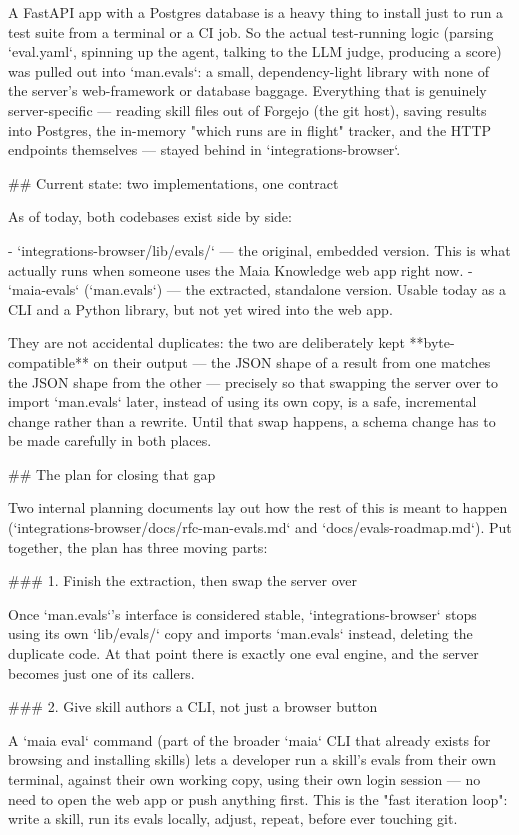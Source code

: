 A FastAPI app with a Postgres database is a heavy thing to install just to run a test suite from a terminal or a CI job.
So the actual test-running logic (parsing `eval.yaml`, spinning up the agent, talking to the LLM judge, producing a score) was pulled out into `man.evals`: a small, dependency-light library with none of the server's web-framework or database baggage.
Everything that is genuinely server-specific — reading skill files out of Forgejo (the git host), saving results into Postgres, the in-memory "which runs are in flight" tracker, and the HTTP endpoints themselves — stayed behind in `integrations-browser`.

## Current state: two implementations, one contract

As of today, both codebases exist side by side:

- `integrations-browser/lib/evals/` — the original, embedded version. This is what actually runs when someone uses the Maia Knowledge web app right now.
- `maia-evals` (`man.evals`) — the extracted, standalone version. Usable today as a CLI and a Python library, but not yet wired into the web app.

They are not accidental duplicates: the two are deliberately kept **byte-compatible** on their output — the JSON shape of a result from one matches the JSON shape from the other — precisely so that swapping the server over to import `man.evals` later, instead of using its own copy, is a safe, incremental change rather than a rewrite. Until that swap happens, a schema change has to be made carefully in both places.

## The plan for closing that gap

Two internal planning documents lay out how the rest of this is meant to happen (`integrations-browser/docs/rfc-man-evals.md` and `docs/evals-roadmap.md`). Put together, the plan has three moving parts:

### 1. Finish the extraction, then swap the server over

Once `man.evals`'s interface is considered stable, `integrations-browser` stops using its own `lib/evals/` copy and imports `man.evals` instead, deleting the duplicate code.
At that point there is exactly one eval engine, and the server becomes just one of its callers.

### 2. Give skill authors a CLI, not just a browser button

A `maia eval` command (part of the broader `maia` CLI that already exists for browsing and installing skills) lets a developer run a skill's evals from their own terminal, against their own working copy, using their own login session — no need to open the web app or push anything first. This is the "fast iteration loop": write a skill, run its evals locally, adjust, repeat, before ever touching git.


